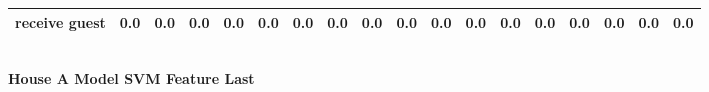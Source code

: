 \documentclass{article}
\begin{document}
\begin{sideways}
\begin{tabular}{lrrrrrrrrrrrrrrrrr}
receive guest                 &         0.0 &                0.0 &           0.0 &               0.0 &                0.0 &                0.0 &              0.0 &                      0.0 &                   0.0 &              0.0 &              0.0 &                            0.0 &                      0.0 &                    0.0 &                                  0.0 &                          0.0 &                  0.0 \\
\bottomrule
\end{tabular}
\end{sideways}
\normalsize
\vspace{1cm}\\
\textbf{House A Model SVM Feature Last}\\
\vspace{1cm}\\
\end{document}
